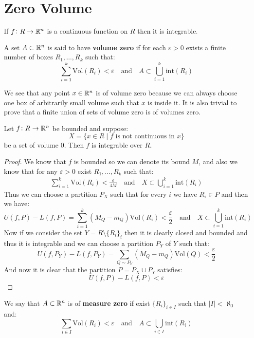 \documentclass[11pt,a4paper]{article}
\begin{document}
	\newpage
	
	\section{Zero Volume}
	\begin{remark}
		If $f \colon R \to \mathbb{R}^n$ is a continuous function on $R$
		then it is integrable.
	\end{remark}
	\begin{definition}
		A set $A \subset \mathbb{R}^n$ is said to have \textbf{volume zero}
		if for each $\varepsilon > 0$ exists a finite number of
		boxes $R_1,\dots,R_k$ such that:
		\[
			\sum_{i=1}^{k}{\mathrm{Vol}(R_i)} < \varepsilon
			\quad \text{and} \quad
			A \subset \bigcup_{i=1}^{k}{\text{int}(R_i)}
		\]
	\end{definition}
	We see that any point $x \in \mathbb{R}^n$ is of volume zero because
	we can always choose one box of arbitrarily small volume such that
	$x$ is inside it. It is also trivial to prove that a finite
	union of sets of volume zero is of volumes zero.
	\begin{theorem}
		Let $f \colon R \to \mathbb{R}^n$ be bounded and suppose:
		\[
			X = \{x \in R \mid \text{$f$ is not continuous in $x$}\}
		\]
		be a set of volume $0$. Then $f$ is integrable over $R$.
	\end{theorem}
	\begin{proof}
		We know that $f$ is bounded so we can denote its bound $M$,
		and also we know that for any $\varepsilon > 0 $ exist
		$R_1,\dots,R_k$ such that:
		\begin{align*}
			\sum_{i=1}^{k}{\mathrm{Vol}(R_i)} < \frac{\varepsilon}{4M}
			\quad \text{and} \quad
			X \subset \bigcup_{i=1}^{k}{\text{int}(R_i)}
		\end{align*}
		Thus we can choose a partition $P_X$ such that for every $i$
		we have $R_i \in P$ and then we have:
		\[
			U(f,P) - L(f,P) = 
			\sum_{i=1}^{k}{(M_Q-m_Q)\mathrm{Vol}(R_i)} < 
			\frac{\varepsilon}{2}
			\quad \text{and} \quad
			X \subset \bigcup_{i=1}^{k}{\text{int}(R_i)}
		\]
		Now if we consider the set $Y = R \setminus \{R_i\}_i$ then
		it is clearly closed and bounded and thus it is integrable
		and we can choose a partition $P_Y$ of $Y$ such that:
		\[
			U(f,P_Y) - L(f,P_Y) = 
			\sum_{Q \sim P_Y}{(M_Q-m_Q)\mathrm{Vol}(Q)} < 
			\frac{\varepsilon}{2}
		\]
		And now it is clear that the partition $P = P_X \cup P_Y$
		satisfies:
		\[
			U(f,P) - L(f,P) < \varepsilon
		\]
	\end{proof}
	\begin{definition}
		We say that $A \subset \mathbb{R}^n$ is of \textbf{measure zero} if
		exist $\{R_i\}_{i \in I}$ such that $|I| < \aleph_0$ and:
		\[
			\sum_{i \in I}{\mathrm{Vol}(R_i)} < \varepsilon
			\quad \text{and} \quad
			A \subset \bigcup_{i \in I}{\text{int}(R_i)}
		\]
	\end{definition}
\end{document}
